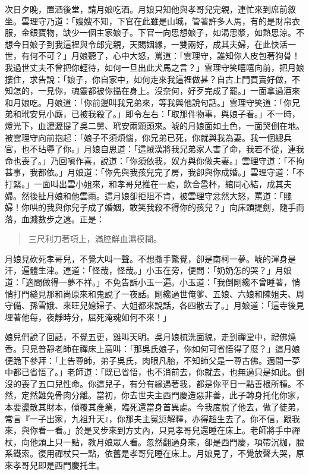 次日夕晚，置酒後堂，請月娘吃酒。月娘只知他與孝哥兒完親，連忙來到席前敘坐。雲理守乃道：「嫂嫂不知，下官在此雖是山城，管著許多人馬，有的是財帛衣服，金銀寶物，缺少一個主家娘子。下官一向思想娘子，如渴思漿，如熱思涼。不想今日娘子到我這裡與令郎完親，天賜姻緣，一雙兩好，成其夫婦，在此快活一世，有何不可？」月娘聽了，心中大怒，罵道：「雲理守，誰知你人皮包著狗骨！我過世丈夫不曾把你輕待，如何一旦出此犬馬之言？」雲理守笑嘻嘻向前，把月娘摟住，求告說：「娘子，你自家中，如何走來我這裡做甚？自古上門買賣好做，不知怎的，一見你，魂靈都被你攝在身上。沒奈何，好歹完成了罷。」一面拿過酒來和月娘吃。月娘道：「你前邊叫我兄弟來，等我與他說句話。」雲理守笑道：「你兄弟和玳安兒小廝，已被我殺了。」即令左右：「取那件物事，與娘子看。」不一時，燈光下，血瀝瀝提了吳二舅、玳安兩顆頭來。唬的月娘面如土色，一面哭倒在地。被雲理守向前抱起：「娘子不須煩惱，你兄弟已死，你就與我為妻。我一個總兵官，也不玷辱了你。」月娘自思道：「這賊漢將我兄弟家人害了命，我若不從，連我命也喪了。」乃回嗔作喜，說道：「你須依我，奴方與你做夫妻。」雲理守道：「不拘甚事，我都依。」月娘道：「你先與我孩兒完了房，我卻與你成婚。」雲理守道：「不打緊。」一面叫出雲小姐來，和孝哥兒推在一處，飲合巹杯，綰同心結，成其夫婦。然後扯月娘和他雲雨。這月娘卻拒阻不肯，被雲理守忿然大怒，罵道：「賤婦！你哄的我與你兒子成了婚姻，敢笑我殺不得你的孩兒？」向床頭提劍，隨手而落，血濺數步之遠。正是：
\begin{quote}
三尺利刀著項上，滿腔鮮血濕模糊。
\end{quote}

月娘見砍死孝哥兒，不覺大叫一聲。不想撒手驚覺，卻是南柯一夢。唬的渾身是汗，遍體生津。連道：「怪哉，怪哉。」小玉在旁，便問：「奶奶怎的哭？」月娘道：「適間做得一夢不祥。」不免告訴小玉一遍。小玉道：「我倒剛纔不曾睡著，悄悄打門縫見那和尚原來和鬼說了一夜話。剛纔過世俺爹、五娘、六娘和陳姐夫、周守備、孫雪娥、來旺兒媳婦子、大姐都來說話，各四散去了。」月娘道：「這寺後見埋著他每，夜靜時分，屈死淹魂如何不來！」

娘兒們說了回話，不覺五更，雞叫天明。吳月娘梳洗面貌，走到禪堂中，禮佛燒香。只見普靜老師在禪床上高叫：「那吳氏娘子，你如何可省悟得了麼？」這月娘便跪下參拜：「上告尊師，弟子吳氏，肉眼凡胎，不知師父是一尊古佛。適間一夢中都已省悟了。」老師道：「既已省悟，也不消前去，你就去，也無過只是如此。倒沒的喪了五口兒性命。你這兒子，有分有緣遇著我，都是你平日一點善根所種。不然，定然難免骨肉分離。當初，你去世夫主西門慶造惡非善，此子轉身托化你家，本要盪散其財本，傾覆其產業，臨死還當身首異處。今我度脫了他去，做了徒弟，常言『一子出家，九祖升天』，你那夫主冤愆解釋，亦得超生去了。你不信，跟我來，與你看一看。」於是叉步來到方丈內，只見孝哥兒還睡在床上。老師將手中禪杖，向他頭上只一點，教月娘眾人看。忽然翻過身來，卻是西門慶，項帶沉枷，腰系鐵索。復用禪杖只一點，依舊是孝哥兒睡在床上。月娘見了，不覺放聲大哭，原來孝哥兒即是西門慶托生。

